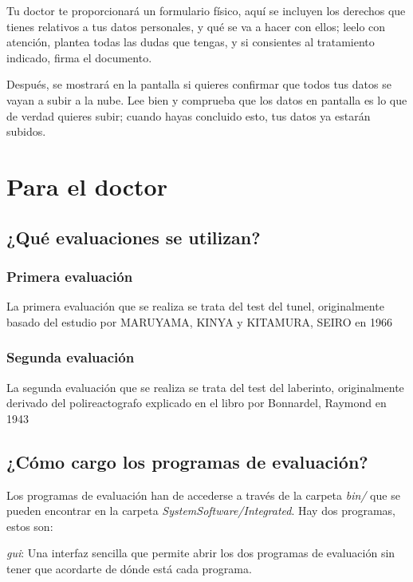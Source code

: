 \documentclass[12pt,a4paper,twoside,openright]{book}
\begin{document}
\begin{umaappendices}
Tu doctor te proporcionará un formulario físico, aquí se incluyen los derechos que tienes relativos a tus datos personales, y qué se va a hacer con ellos; leelo con atención, plantea todas las dudas que tengas, y si consientes al tratamiento indicado, firma el documento.

Después, se mostrará en la pantalla si quieres confirmar que todos tus datos se vayan a subir a la nube. Lee bien y comprueba que los datos en pantalla es lo que de verdad quieres subir; cuando hayas concluido esto, tus datos ya estarán subidos.

\section{Para el doctor}

\subsection{¿Qué evaluaciones se utilizan?}

\subsubsection{Primera evaluación}

La primera evaluación que se realiza se trata del test del tunel, originalmente basado del estudio por MARUYAMA, KINYA y KITAMURA, SEIRO en 1966 \cite{maruyama1966speed}

\subsubsection{Segunda evaluación}

La segunda evaluación que se realiza se trata del test del laberinto, originalmente derivado del polireactografo explicado en el libro por Bonnardel, Raymond en 1943 \cite{bonnardel1943adaptation}

\subsection{¿Cómo cargo los programas de evaluación?}

Los programas de evaluación han de accederse a través de la carpeta \textit{bin/} que se pueden encontrar en la carpeta \textit{SystemSoftware/Integrated}. Hay dos programas, estos son:

\textit{gui}: Una interfaz sencilla que permite abrir los dos programas de evaluación sin tener que acordarte de dónde está cada programa.


\end{umaappendices}
\end{document}
